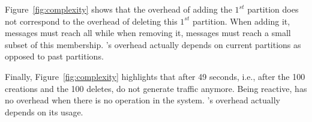 \begin{asparadesc}
\noindent Figure~\ref{fig:complexity} shows that the overhead of
adding the $1^{st}$ partition does not correspond to the overhead of
deleting this $1^{st}$ partition. When adding it, messages must reach
all \processes while when removing it, messages must reach a small
subset of this membership.  \NAME's overhead actually depends on
current partitions as opposed to past partitions.

\noindent Finally, Figure~\ref{fig:complexity} highlights that after
49 seconds, i.e., after the 100 creations and the 100 deletes, \processes
do not generate traffic anymore. Being reactive, \NAME has no overhead
 when there is no operation in the system. \NAME's overhead actually
depends on its usage.

\end{asparadesc}



